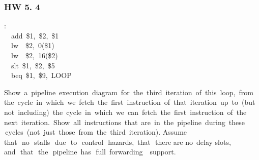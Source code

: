 \documentclass[xcolor=table]{beamer}
\begin{document}
\begin{mdframe}%

\frametitle{HW 5. 4}\label{heading-sec-hw-5-4}%
\begin{mdpre}%
:\\
~~{add}~\$1,~\$2,~\$1\\
~~{lw}~~\$2,~{0}(\$1)\\
~~{lw}~~\$2,~{16}(\$2)\\
~~{slt}~\$1,~\$2,~\$5\\
~~{beq}~\$1,~\$9,~{LOOP}%
\end{mdpre}\noindent{} Show  a  pipeline  execution  diagram  for  the  third  iteration  of  this  loop,  from  the  cycle  in  which  we  fetch  the  first  instruction  of  that  iteration  up  to  (but  not  including)  the  cycle  in  which  we  can  fetch  the  first  instruction  of  the  next  iteration.  Show  all  instructions  that  are  in  the  pipeline  during  these  cycles  (not  just  those  from  the  third  iteration). Assume that  no  stalls  due  to  control  hazards,  that  there are no  delay slots,  and  that  the  pipeline  has  full  forwarding   support.
\end{mdframe}\label{sec-hw-5-4}%
\end{document}
